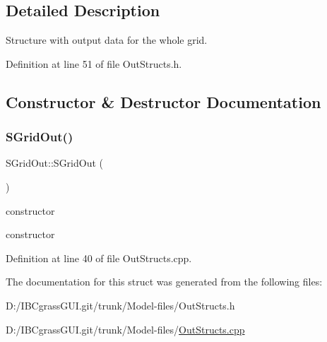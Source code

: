 \subsection{Detailed Description}
Structure with output data for the whole grid. 

Definition at line 51 of file Out\+Structs.\+h.



\subsection{Constructor \& Destructor Documentation}
\mbox{\label{struct_s_grid_out_a18aaa89470973872eabd14ca01e1e27d}} 
\subsubsection{\texorpdfstring{SGridOut()}{SGridOut()}}
{\footnotesize\ttfamily S\+Grid\+Out\+::\+S\+Grid\+Out (\begin{DoxyParamCaption}{ }\end{DoxyParamCaption})}



constructor 

constructor 

Definition at line 40 of file Out\+Structs.\+cpp.



The documentation for this struct was generated from the following files\+:\begin{DoxyCompactItemize}
\item 
D\+:/\+I\+B\+Cgrass\+G\+U\+I.\+git/trunk/\+Model-\/files/Out\+Structs.\+h\item 
D\+:/\+I\+B\+Cgrass\+G\+U\+I.\+git/trunk/\+Model-\/files/\mbox{\hyperlink{_out_structs_8cpp}{Out\+Structs.\+cpp}}\end{DoxyCompactItemize}
